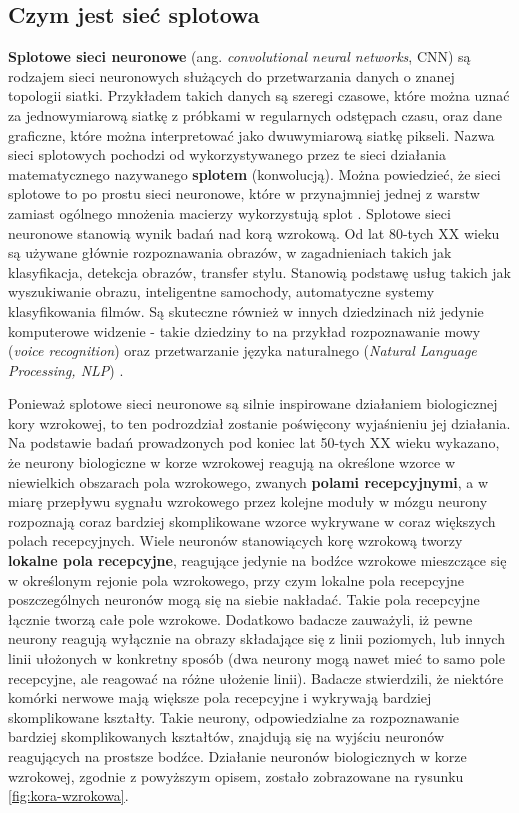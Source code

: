 \documentclass[12pt]{mwbk}
\theoremstyle{plain}
\theoremstyle{definition}
\theoremstyle{remark}
\begin{document}
\subsection{Czym jest sieć splotowa}

\textbf{Splotowe sieci neuronowe} (ang. \emph{convolutional neural networks}, CNN) są rodzajem sieci neuronowych służących do przetwarzania danych o znanej topologii siatki. Przykładem takich danych są szeregi czasowe, które można uznać za jednowymiarową siatkę z próbkami w regularnych odstępach czasu, oraz dane graficzne, które można interpretować jako dwuwymiarową siatkę pikseli. Nazwa sieci splotowych pochodzi od wykorzystywanego przez te sieci działania matematycznego nazywanego \textbf{splotem} (konwolucją). Można powiedzieć, że sieci splotowe to po prostu sieci neuronowe, które w przynajmniej jednej z warstw zamiast ogólnego mnożenia macierzy wykorzystują splot \cite{goodfellow}.
Splotowe sieci neuronowe stanowią wynik badań nad korą wzrokową. Od lat 80-tych XX wieku są używane głównie rozpoznawania obrazów, w zagadnieniach takich jak klasyfikacja, detekcja obrazów, transfer stylu. Stanowią podstawę usług takich jak wyszukiwanie obrazu, inteligentne samochody, automatyczne systemy klasyfikowania filmów. Są skuteczne również w innych dziedzinach niż jedynie komputerowe widzenie - takie dziedziny to na przykład rozpoznawanie mowy (\emph{voice recognition}) oraz przetwarzanie języka naturalnego (\emph{Natural Language Processing, NLP}) \cite{geron}. 


Ponieważ splotowe sieci neuronowe są silnie inspirowane działaniem biologicznej kory wzrokowej, to ten podrozdział zostanie poświęcony wyjaśnieniu jej działania. Na podstawie badań prowadzonych pod koniec lat 50-tych XX wieku \cite{hubel1} \cite{hubel2} wykazano, że neurony biologiczne w korze wzrokowej reagują na określone wzorce w niewielkich obszarach pola wzrokowego, zwanych \textbf{polami recepcyjnymi}, a w miarę przepływu sygnału wzrokowego przez kolejne moduły w mózgu neurony rozpoznają coraz bardziej skomplikowane wzorce wykrywane w coraz większych polach recepcyjnych.
Wiele neuronów stanowiących korę wzrokową tworzy \textbf{lokalne pola recepcyjne}, reagujące jedynie na bodźce wzrokowe mieszczące się w określonym rejonie pola wzrokowego, przy czym lokalne pola recepcyjne poszczególnych neuronów mogą się na siebie nakładać. Takie pola recepcyjne łącznie tworzą całe pole wzrokowe. Dodatkowo badacze zauważyli, iż pewne neurony reagują wyłącznie na obrazy składające się z linii poziomych, lub innych linii ułożonych w konkretny sposób (dwa neurony mogą nawet mieć to samo pole recepcyjne, ale reagować na różne ułożenie linii). Badacze stwierdzili, że niektóre komórki nerwowe mają większe pola recepcyjne i wykrywają bardziej skomplikowane kształty. Takie neurony, odpowiedzialne za rozpoznawanie bardziej skomplikowanych kształtów, znajdują się na wyjściu neuronów reagujących na prostsze bodźce. Działanie neuronów biologicznych w korze wzrokowej, zgodnie z powyższym opisem, zostało zobrazowane na rysunku \ref{fig:kora-wzrokowa}.
\end{document}
